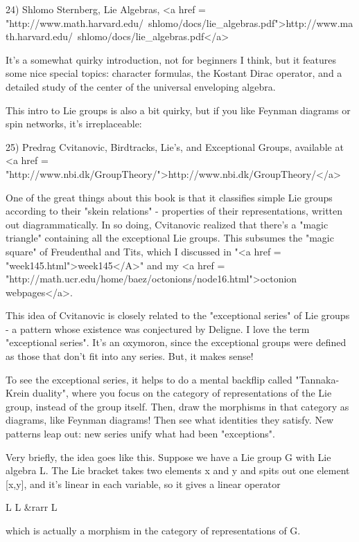 24) Shlomo Sternberg, Lie Algebras, 
<a href = "http://www.math.harvard.edu/~shlomo/docs/lie_algebras.pdf">http://www.math.harvard.edu/~shlomo/docs/lie_algebras.pdf</a>

It's a somewhat quirky introduction, not for beginners I think, but
it features some nice special topics: character formulas, the Kostant
Dirac operator, and a detailed study of the center of the universal
enveloping algebra.  

This intro to Lie groups is also a bit quirky, but if you like Feynman 
diagrams or spin networks, it's irreplaceable:

25) Predrag Cvitanovic, Birdtracks, Lie's, and Exceptional Groups,
available at <a href = "http://www.nbi.dk/GroupTheory/">http://www.nbi.dk/GroupTheory/</a>

One of the great things about this book is that it classifies simple
Lie groups according to their "skein relations" - properties
of their representations, written out diagrammatically.  In so doing,
Cvitanovic realized that there's a "magic triangle"
containing all the exceptional Lie groups.  This subsumes the
"magic square" of Freudenthal and Tits, which I discussed in
"<a href = "week145.html">week145</A>" and my 
<a href = "http://math.ucr.edu/home/baez/octonions/node16.html">octonion
webpages</a>.

This idea of Cvitanovic is closely related to the "exceptional
series" of Lie groups - a pattern whose existence was conjectured
by Deligne.  I love the term "exceptional series".   It's 
an oxymoron, since the exceptional groups were defined as those that 
don't fit into any series.  But, it makes sense!   

To see the exceptional series, it helps to do a mental backflip called
"Tannaka-Krein duality", where you focus on the category of
representations of the Lie group, instead of the group itself.  Then,
draw the morphisms in that category as diagrams, like Feynman
diagrams!  Then see what identities they satisfy.  New patterns leap
out: new series unify what had been "exceptions".

Very briefly, the idea goes like this.  Suppose we have a Lie group
G with Lie algebra L.  The Lie bracket takes two elements x and y and spits out 
one element [x,y], and it's linear in each variable, so it gives a 
linear operator

L \otimes  L &rarr L

which is actually a morphism in the category of representations of G.

